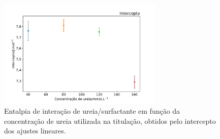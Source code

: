 \begin{figure}[H]
	\centering
	\includegraphics[width=0.7\textwidth]{imagens/itc/interacao_intercepto}
	\caption{Entalpia de interação de ureia/surfactante em função da concentração de ureia utilizada na titulação, obtidos pelo intercepto dos ajustes lineares.}
	\label{fig:itc_interacaoUrSurf_intercepto}
\end{figure}

